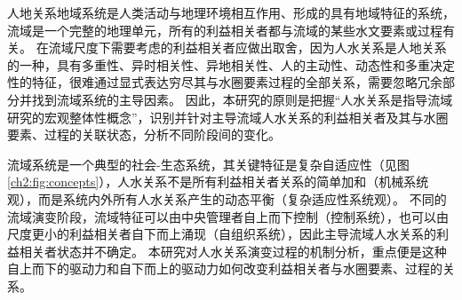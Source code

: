 



人地关系地域系统是人类活动与地理环境相互作用、形成的具有地域特征的系统\cite{tan2021}，流域是一个完整的地理单元，所有的利益相关者都与流域的某些水文要素或过程有关。
在流域尺度下需要考虑的利益相关者应做出取舍，因为人水关系是人地关系的一种，具有多重性、异时相关性、异地相关性、人的主动性、动态性和多重决定性的特征\cite{fang2004}，很难通过显式表达穷尽其与水圈要素过程的全部关系，需要忽略冗余部分并找到流域系统的主导因素。
因此，本研究的原则是把握“人水关系是指导流域研究的宏观整体性概念”，识别并针对主导流域人水关系的利益相关者及其与水圈要素、过程的关联状态，分析不同阶段间的变化。

流域系统是一个典型的社会-生态系统，其关键特征是复杂自适应性（见图\ref{ch2:fig:concepts}），人水关系不是所有利益相关者关系的简单加和（机械系统观），而是系统内外所有人水关系产生的动态平衡（复杂适应性系统观）。
不同的流域演变阶段，流域特征可以由中央管理者自上而下控制（控制系统），也可以由尺度更小的利益相关者自下而上涌现（自组织系统），因此主导流域人水关系的利益相关者状态并不确定。
本研究对人水关系演变过程的机制分析，重点便是这种自上而下的驱动力和自下而上的驱动力如何改变利益相关者与水圈要素、过程的关系。

